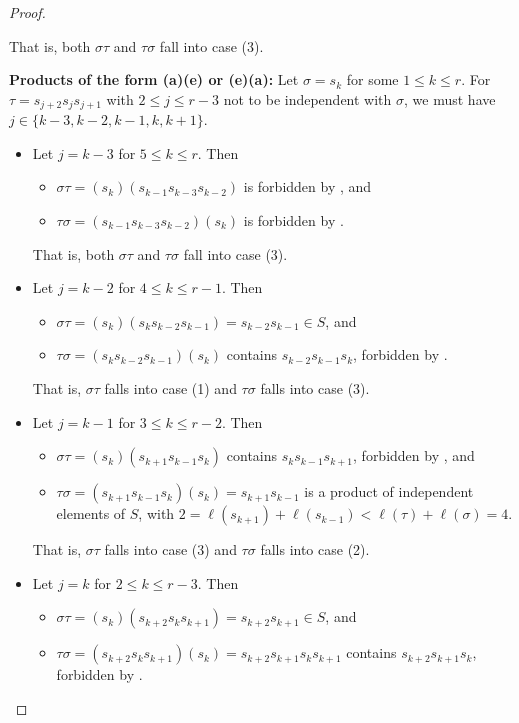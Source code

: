 \documentclass{amsart}
\theoremstyle{definition}
\begin{document}
\begin{appendices}
\begin{proof}
\begin{itemize}
        That is, both $\sigma\tau$ and $\tau\sigma$ fall into case (3).
    \end{itemize}
\smallskip
\noindent \textbf{Products of the form (a)(e) or (e)(a):}
    Let $\sigma=s_k$ for some $1\leq k\leq r$. For $\tau=s_{j+2}s_{j}s_{j+1}$ with $2\leq j\leq r-3$ not to be independent with $\sigma$, we must have $j\in\{k-3, k-2, k-1, k, k+1\}$.
    \begin{itemize}
        \item Let $j=k-3$ for $5\leq k\leq r$. Then \begin{itemize}
            \item $\sigma\tau= (s_{k})(s_{k-1}s_{k-3}s_{k-2})$ is forbidden by , and
            \item $\tau\sigma=(s_{k-1}s_{k-3}s_{k-2})(s_{k})$ is forbidden by .
        \end{itemize}
        That is, both $\sigma\tau$ and $\tau\sigma$ fall into case (3).
        \item Let $j=k-2$ for $4\leq k\leq r-1$. Then \begin{itemize}
            \item $\sigma\tau= (s_{k})(s_{k}s_{k-2}s_{k-1}) = s_{k-2}s_{k-1}\in S$, and
            \item $\tau\sigma= (s_{k}s_{k-2}s_{k-1})(s_{k})$ contains $s_{k-2}s_{k-1}s_k$, forbidden by .
        \end{itemize}
        That is, $\sigma\tau$ falls into case (1) and $\tau\sigma$ falls into case (3).
        \item Let $j=k-1$ for $3\leq k\leq r-2$. Then \begin{itemize}
            \item $\sigma\tau= (s_{k})(s_{k+1}s_{k-1}s_{k})$ contains $s_{k}s_{k-1}s_{k+1}$, forbidden by , and
            \item $\tau\sigma= (s_{k+1}s_{k-1}s_{k})(s_{k}) = s_{k+1}s_{k-1}$ is a product of independent elements of $S$, with $2=\ell(s_{k+1})+\ell(s_{k-1})<\ell(\tau)+\ell(\sigma)=4$.
        \end{itemize}
        That is, $\sigma\tau$ falls into case (3) and $\tau\sigma$ falls into case (2).
        \item Let $j=k$ for $2\leq k\leq r-3$. Then \begin{itemize}
            \item $\sigma\tau= (s_{k})(s_{k+2}s_{k}s_{k+1}) = s_{k+2}s_{k+1}\in S$, and
            \item $\tau\sigma= (s_{k+2}s_{k}s_{k+1})(s_{k})=s_{k+2}s_{k+1}s_ks_{k+1}$ contains $s_{k+2}s_{k+1}s_k$, forbidden by .

\end{itemize}
\end{itemize}
\end{proof}
\end{appendices}
\end{document}
